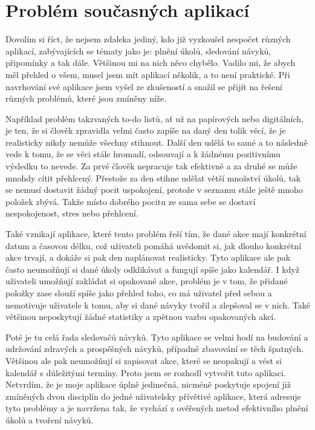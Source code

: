 \section{Problém současných aplikací}
\hspace{14pt} Dovolím si říct, že nejsem zdaleka jediný, kdo již vyzkoušel nespočet různých aplikací, zabývajících se tématy jako je: plnění úkolů, sledování návyků, připomínky a tak dále. Většinou mi na nich něco chybělo. Vadilo mi, že abych měl přehled o všem, musel jsem mít aplikací několik, a to není praktické. Při navrhování své aplikace jsem vyšel ze zkušeností a snažil se přijít na řešení různých problémů, které jsou zmíněny níže.

Například problém takzvaných to-do listů, ať už na papírových nebo digitálních, je ten, že si člověk zpravidla velmi často zapíše na daný den tolik věcí, že je realisticky nikdy nemůže všechny stihnout. Další den udělá to samé a to následně vede k tomu, že se věci stále hromadí, odsouvají a k žádnému pozitivnímu výsledku to nevede. Za prvé člověk nepracuje tak efektivně a za druhé se může mnohdy cítit přehlcený. Přestože za den stihne udělat větší množství úkolů, tak se nemusí dostavit žádný pocit uspokojení, protože v seznamu stále ještě mnoho položek zbývá. Takže místo dobrého pocitu ze sama sebe se dostaví nespokojenost, stres nebo přehlcení.

Také vznikají aplikace, které tento problém řeší tím, že dané akce mají konkrétní datum a časovou délku, což uživateli pomáhá uvědomit si, jak dlouho konkrétní akce trvají, a dokáže si pak den naplánovat realisticky. Tyto aplikace ale pak často neumožňují si dané úkoly odklikávat a fungují spíše jako kalendář. I když uživateli umožňují zakládat si opakované akce, problém je v tom, že přidané položky zase slouží spíše jako přehled toho, co má uživatel před sebou a nemotivuje uživatele k tomu, aby si dané návyky tvořil a zlepšoval se v nich. Také většinou neposkytují žádné statistiky a zpětnou vazbu opakovaných akcí.

Poté je tu celá řada sledovačů návyků. Tyto aplikace se velmi hodí na budování a udržování zdravých a prospěšných návyků, případně zbavování se těch špatných. Většinou ale pak neumožňují si zapisovat akce, které se neopakují a vést si kalendář s důležitými termíny. 
\newpage
Proto jsem se rozhodl vytvořit tuto aplikaci. Netvrdím, že je moje aplikace úplně jedinečná, nicméně poskytuje spojení již zmíněných dvou disciplín do jedné uživatelsky přívětivé aplikace, která adresuje tyto problémy a je navržena tak, že vychází z ověřených metod efektivního plnění úkolů a tvoření návyků.

